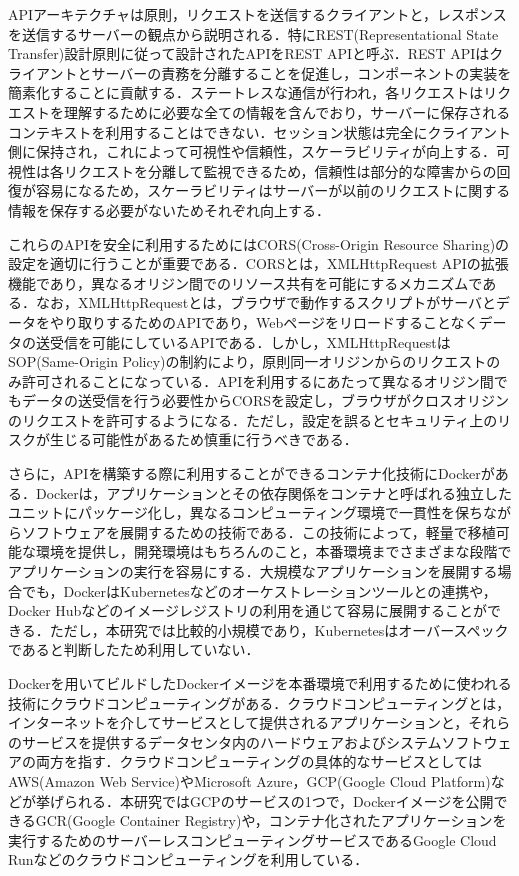       \par APIアーキテクチャは原則，リクエストを送信するクライアントと，レスポンスを送信するサーバーの観点から説明される．特にREST(Representational State Transfer)設計原則に従って設計されたAPIをREST APIと呼ぶ．REST APIはクライアントとサーバーの責務を分離することを促進し，コンポーネントの実装を簡素化することに貢献する．ステートレスな通信が行われ，各リクエストはリクエストを理解するために必要な全ての情報を含んでおり，サーバーに保存されるコンテキストを利用することはできない．セッション状態は完全にクライアント側に保持され，これによって可視性や信頼性，スケーラビリティが向上する．可視性は各リクエストを分離して監視できるため，信頼性は部分的な障害からの回復が容易になるため，スケーラビリティはサーバーが以前のリクエストに関する情報を保存する必要がないためそれぞれ向上する．
      \par これらのAPIを安全に利用するためにはCORS(Cross-Origin Resource Sharing)の設定を適切に行うことが重要である．CORSとは，XMLHttpRequest APIの拡張機能であり，異なるオリジン間でのリソース共有を可能にするメカニズムである．なお，XMLHttpRequestとは，ブラウザで動作するスクリプトがサーバとデータをやり取りするためのAPIであり，Webページをリロードすることなくデータの送受信を可能にしているAPIである．しかし，XMLHttpRequestはSOP(Same-Origin Policy)の制約により，原則同一オリジンからのリクエストのみ許可されることになっている．APIを利用するにあたって異なるオリジン間でもデータの送受信を行う必要性からCORSを設定し，ブラウザがクロスオリジンのリクエストを許可するようになる．ただし，設定を誤るとセキュリティ上のリスクが生じる可能性があるため慎重に行うべきである．
      \par さらに，APIを構築する際に利用することができるコンテナ化技術にDockerがある．Dockerは，アプリケーションとその依存関係をコンテナと呼ばれる独立したユニットにパッケージ化し，異なるコンピューティング環境で一貫性を保ちながらソフトウェアを展開するための技術である．この技術によって，軽量で移植可能な環境を提供し，開発環境はもちろんのこと，本番環境までさまざまな段階でアプリケーションの実行を容易にする．大規模なアプリケーションを展開する場合でも，DockerはKubernetesなどのオーケストレーションツールとの連携や，Docker Hubなどのイメージレジストリの利用を通じて容易に展開することができる．ただし，本研究では比較的小規模であり，Kubernetesはオーバースペックであると判断したため利用していない．
      \par Dockerを用いてビルドしたDockerイメージを本番環境で利用するために使われる技術にクラウドコンピューティングがある．クラウドコンピューティングとは，インターネットを介してサービスとして提供されるアプリケーションと，それらのサービスを提供するデータセンタ内のハードウェアおよびシステムソフトウェアの両方を指す．クラウドコンピューティングの具体的なサービスとしてはAWS(Amazon Web Service)やMicrosoft Azure，GCP(Google Cloud Platform)などが挙げられる．本研究ではGCPのサービスの1つで，Dockerイメージを公開できるGCR(Google Container Registry)や，コンテナ化されたアプリケーションを実行するためのサーバーレスコンピューティングサービスであるGoogle Cloud Runなどのクラウドコンピューティングを利用している．
      
